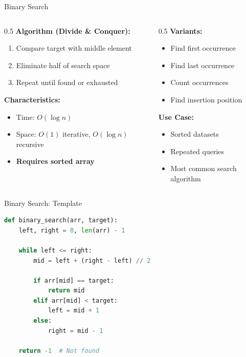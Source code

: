 \documentclass[aspectratio=169,xcolor=dvipsnames]{beamer}
\begin{document}
\begin{frame}{Binary Search}
  \begin{columns}
    \begin{column}{0.5\textwidth}
      \textbf{Algorithm (Divide \& Conquer):}
      \begin{enumerate}
        \item Compare target with middle element
        \item Eliminate half of search space
        \item Repeat until found or exhausted
      \end{enumerate}

      \vspace{0.3cm}
      \textbf{Characteristics:}
      \begin{itemize}
        \item Time: $O(\log n)$
        \item Space: $O(1)$ iterative, $O(\log n)$ recursive
        \item \textbf{Requires sorted array}
      \end{itemize}
    \end{column}

    \begin{column}{0.5\textwidth}
      \textbf{Variants:}
      \begin{itemize}
        \item Find first occurrence
        \item Find last occurrence
        \item Count occurrences
        \item Find insertion position
      \end{itemize}

      \vspace{0.3cm}
      \textbf{Use Case:}
      \begin{itemize}
        \item Sorted datasets
        \item Repeated queries
        \item Most common search algorithm
      \end{itemize}
    \end{column}
  \end{columns}
\end{frame}

\begin{frame}[fragile]{Binary Search: Template}
\begin{lstlisting}[language=Python]
def binary_search(arr, target):
    left, right = 0, len(arr) - 1

    while left <= right:
        mid = left + (right - left) // 2

        if arr[mid] == target:
            return mid
        elif arr[mid] < target:
            left = mid + 1
        else:
            right = mid - 1

    return -1  # Not found
\end{lstlisting}
\end{frame}
\end{document}
